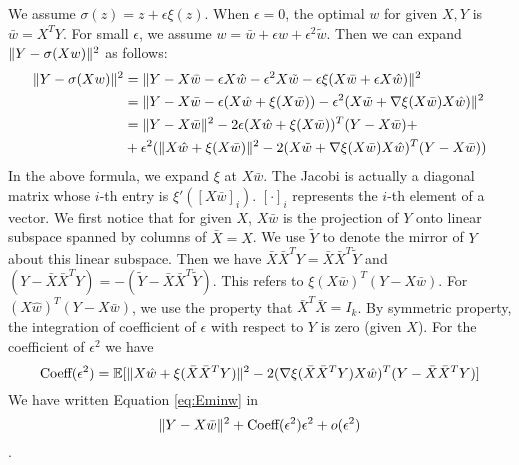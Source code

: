 \documentclass{article}
\DeclarePairedDelimiter\norm{\lVert}{\rVert}
\def\E{\mathbb{E}}
\begin{document}
We assume $\sigma(z) = z + \epsilon \xi(z)$. When $\epsilon = 0$, the optimal $w$ for given $X, Y$ is 
$\bar{w} =X^T Y $. For small $\epsilon$, we assume $ w = \bar{w} + \epsilon \hat{w} + \epsilon^2 \tilde{w}$. Then we can expand $\norm{Y - \sigma (X w ) }^2$ as follows:
\begin{align*}
\norm{Y - \sigma (X w ) }^2 & = \norm{Y - X \bar{w} - \epsilon X \hat{w} - \epsilon^2 X \tilde{w} - \epsilon \xi(X \bar{w} + \epsilon X\hat{w}) }^2 \\
& = \norm{ Y - X  \bar{w}  - \epsilon (X\hat{w} + \xi(X \bar{w} )) - \epsilon^2(X\tilde{w} + \nabla \xi(X \bar{w} )X\hat{w})}^2 \\
& = \norm{Y-X \bar{w}  }^2 - 2 \epsilon (X \hat{w} + \xi(X \bar{w}))^T (Y-X \bar{w}) +\\
& +\epsilon^2(\norm{X\hat{w} + \xi(X \bar{w})}^2 - 2 (X \tilde{w}+ \nabla \xi(X \bar{w})X\hat{w})^T(Y-X \bar{w}))
\end{align*}
In the above formula,  we expand $\xi$ at $X \bar{w}$. The Jacobi is actually a diagonal matrix whose $i$-th entry is $\xi'([X\bar{w}]_i)$. $[\cdot]_i$ represents the $i$-th element of a vector.
We first notice that for given $X$, $X\bar{w}$ is the projection of $Y$ onto linear subspace spanned by columns of $\bar{X} =X$. We use $\tilde{Y}$ to denote the mirror of $Y$ about this linear subspace. Then we have
$\bar{X}\bar{X}^T Y = \bar{X}\bar{X}^T \tilde{Y}$ and $(Y- \bar{X}\bar{X}^TY) = -(\tilde{Y} - \bar{X}\bar{X}^T \tilde{Y})$. This refers to $\xi(X\bar{w})^T (Y-X\bar{w})$. For $(X\hat{w})^T (Y-X\bar{w})$, we use the property that $  \bar{X}^T \bar{X} = I_k$.
By symmetric property, the integration of coefficient of $\epsilon$ with respect to $Y$ is zero (given $X$). 
 For the coefficient of $\epsilon^2$ we have
\begin{equation*}
\textrm{Coeff}(\epsilon^2)  =  \E[\norm{X\hat{w} + \xi(\bar{X}\bar{X}^TY)}^2 - 2 (\nabla \xi(\bar{X}\bar{X}^TY)X\hat{w})^T(Y-\bar{X}\bar{X}^TY)]
\end{equation*}
We have written Equation \eqref{eq:Eminw} in $$ \norm{Y - X \bar{w}}^2 + \textrm{Coeff}(\epsilon^2) \epsilon^2 + o(\epsilon^2)$$.
\end{document}
